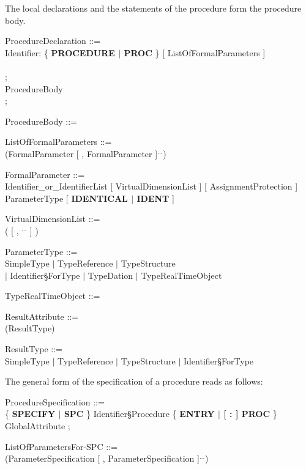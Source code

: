 The local declarations and the statements of the procedure form the
procedure body.

ProcedureDeclaration ::= \\
\x Identifier: \{ {\bf PROCEDURE $\mid$ PROC} \} [ ListOfFormalParameters ]\\
\x [ ResultAttribute ]\\
\x [ GlobalAttribute ] ;\\
\x ProcedureBody\\
;

ProcedureBody ::= \\
\x [ Declaration$^{...}$ ] [ Statement$^{...}$ ]

ListOfFormalParameters ::=\\
\x (FormalParameter [ , FormalParameter ]$^{...}$)

FormalParameter ::=\\
\x Identifier\_or\_IdentifierList [ VirtualDimensionList ] [ AssignmentProtection ]\\
\x ParameterType [ {\bf IDENTICAL $\mid$ IDENT} ]

VirtualDimensionList ::=\\
\x ( [ , $^{...}$ ] )

ParameterType ::= \\
\x SimpleType $\mid$ TypeReference $\mid$ TypeStructure\\
\x $\mid$ Identifier\S ForType $\mid$ TypeDation $\mid$ TypeRealTimeObject

TypeRealTimeObject ::=\\

ResultAttribute ::= \\
(ResultType)

ResultType ::= \\
\x SimpleType $\mid$ TypeReference $\mid$ TypeStructure $\mid$ Identifier\S ForType

The general form of the specification of a procedure reads as follows:

ProcedureSpecification ::=\\
\x \{ {\bf SPECIFY $\mid$ SPC} \} Identifier\S Procedure \{ {\bf ENTRY $\mid$ [ : ] PROC} \} \\
 GlobalAttribute ;

ListOfParametersFor-SPC ::=\\
\x (ParameterSpecification [ , ParameterSpecification ]$^{...}$)

